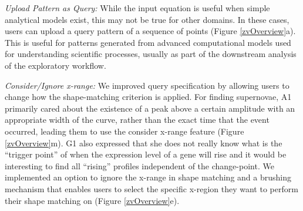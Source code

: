 \par \textit{Upload Pattern as Query:} While the input equation is useful when simple analytical models exist, this may not be true for other domains. In these cases, users can upload a query pattern of a sequence of points (Figure \ref{zvOverview}a). This is useful for patterns generated from advanced computational models used for understanding scientific processes, usually as part of the downstream analysis of the exploratory workflow. %
\par \textit{Consider/Ignore x-range:} We improved query specification by allowing users to change how the shape-matching criterion is applied. For finding supernovae, A1 primarily cared about the existence of a peak above a certain amplitude with an appropriate width of the curve, rather than the exact time that the event occurred, leading them to use the consider x-range feature (Figure \ref{zvOverview}m). G1 also expressed that she does not really know what is the ``trigger point'' of when the expression level of a gene will rise and it would be interesting to find all ``rising'' profiles independent of the change-point.  We implemented an option to ignore the x-range in shape matching and a brushing mechanism that enables users to select the specific x-region they want to perform their shape matching on (Figure \ref{zvOverview}e). 

